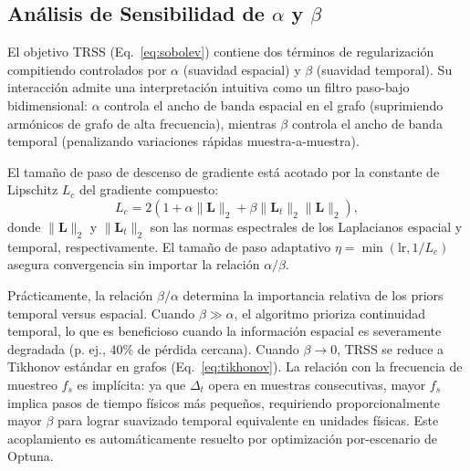 \subsection{Análisis de Sensibilidad de $\alpha$ y $\beta$}

El objetivo TRSS (Eq.~\ref{eq:sobolev}) contiene dos términos de regularización compitiendo controlados por $\alpha$ (suavidad espacial) y $\beta$ (suavidad temporal). Su interacción admite una interpretación intuitiva como un filtro paso-bajo bidimensional: $\alpha$ controla el ancho de banda espacial en el grafo (suprimiendo armónicos de grafo de alta frecuencia), mientras $\beta$ controla el ancho de banda temporal (penalizando variaciones rápidas muestra-a-muestra).

El tamaño de paso de descenso de gradiente está acotado por la constante de Lipschitz $L_c$ del gradiente compuesto:
\begin{equation}
  L_c = 2\left(1 + \alpha \|\mathbf{L}\|_2 + \beta \|\mathbf{L}_t\|_2 \|\mathbf{L}\|_2\right),
  \label{eq:lipschitz}
\end{equation}
donde $\|\mathbf{L}\|_2$ y $\|\mathbf{L}_t\|_2$ son las normas espectrales de los Laplacianos espacial y temporal, respectivamente. El tamaño de paso adaptativo $\eta = \min(\text{lr}, 1/L_c)$ asegura convergencia sin importar la relación $\alpha/\beta$.

Prácticamente, la relación $\beta/\alpha$ determina la importancia relativa de los priors temporal versus espacial. Cuando $\beta \gg \alpha$, el algoritmo prioriza continuidad temporal, lo que es beneficioso cuando la información espacial es severamente degradada (p. ej., 40\% de pérdida cercana). Cuando $\beta \to 0$, TRSS se reduce a Tikhonov estándar en grafos (Eq.~\ref{eq:tikhonov}). La relación con la frecuencia de muestreo $f_s$ es implícita: ya que $\Delta_t$ opera en muestras consecutivas, mayor $f_s$ implica pasos de tiempo físicos más pequeños, requiriendo proporcionalmente mayor $\beta$ para lograr suavizado temporal equivalente en unidades físicas. Este acoplamiento es automáticamente resuelto por optimización por-escenario de Optuna.
